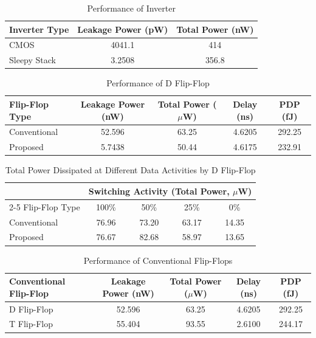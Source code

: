 \documentclass[conference]{IEEEtran}
\begin{document}
\begin{table}[H]
	\centering
	\caption{Performance of Inverter}
	\label{tab:inverter}
	\begin{tabular}{lcc}
		\hline
		Inverter Type & Leakage Power (pW) & Total Power (nW) \\
		\hline
		CMOS         & 4041.1  & 414   \\
		Sleepy Stack & 3.2508  & 356.8 \\
		\hline
	\end{tabular}
\end{table}

\begin{table}[H]
	\centering
	\caption{Performance of D Flip-Flop}
	\label{tab:dff}
	\begin{tabular}{lcccc}
		\hline
		Flip-Flop Type & Leakage Power (nW) & Total Power ($\mu$W) & Delay (ns) & PDP (fJ) \\
		\hline
		Conventional & 52.596 & 63.25 & 4.6205 & 292.25 \\
		Proposed     & 5.7438 & 50.44 & 4.6175 & 232.91 \\
		\hline
	\end{tabular}
\end{table}

\begin{table}[H]
	\centering
	\caption{Total Power Dissipated at Different Data Activities by D Flip-Flop}
	\label{tab:activity}
	\begin{tabular}{lcccc}
		\hline
		& \multicolumn{4}{c}{Switching Activity (Total Power, $\mu$W)} \\
		\cline{2-5}
		Flip-Flop Type & 100\% & 50\% & 25\% & 0\% \\
		\hline
		Conventional & 76.96 & 73.20 & 63.17 & 14.35 \\
		Proposed     & 76.67 & 82.68 & 58.97 & 13.65 \\
		\hline
	\end{tabular}
\end{table}

\begin{table}[H]
	\centering
	\caption{Performance of Conventional Flip-Flops}
	\label{tab:conv_ff}
	\begin{tabular}{lcccc}
		\hline
		Conventional Flip-Flop & Leakage Power (nW) & Total Power ($\mu$W) & Delay (ns) & PDP (fJ) \\
		\hline
		D Flip-Flop & 52.596 & 63.25 & 4.6205 & 292.25 \\
		T Flip-Flop & 55.404 & 93.55 & 2.6100 & 244.17 \\
		\hline
	\end{tabular}
\end{table}
\end{document}
